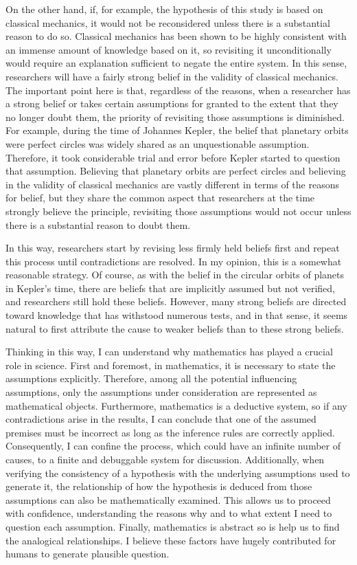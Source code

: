 \documentclass{article}
\begin{document}
On the other hand, if, for example, the hypothesis of this study is based on classical mechanics, it would not be reconsidered unless there is a substantial reason to do so. Classical mechanics has been shown to be highly consistent with an immense amount of knowledge based on it, so revisiting it unconditionally would require an explanation sufficient to negate the entire system. In this sense, researchers will have a fairly strong belief in the validity of classical mechanics. The important point here is that, regardless of the reasons, when a researcher has a strong belief or takes certain assumptions for granted to the extent that they no longer doubt them, the priority of revisiting those assumptions is diminished. For example, during the time of Johannes Kepler, the belief that planetary orbits were perfect circles was widely shared as an unquestionable assumption. Therefore, it took considerable trial and error before Kepler started to question that assumption. Believing that planetary orbits are perfect circles and believing in the validity of classical mechanics are vastly different in terms of the reasons for belief, but they share the common aspect that researchers at the time strongly believe the principle, revisiting those assumptions would not occur unless there is a substantial reason to doubt them.

In this way, researchers start by revising less firmly held beliefs first and repeat this process until contradictions are resolved. In my opinion, this is a somewhat reasonable strategy. Of course, as with the belief in the circular orbits of planets in Kepler's time, there are beliefs that are implicitly assumed but not verified, and researchers still hold these beliefs. However, many strong beliefs are directed toward knowledge that has withstood numerous tests, and in that sense, it seems natural to first attribute the cause to weaker beliefs than to these strong beliefs.

Thinking in this way, I can understand why mathematics has played a crucial role in science. First and foremost, in mathematics, it is necessary to state the assumptions explicitly. Therefore, among all the potential influencing assumptions, only the assumptions under consideration are represented as mathematical objects. Furthermore, mathematics is a deductive system, so if any contradictions arise in the results, I can conclude that one of the assumed premises must be incorrect as long as the inference rules are correctly applied. Consequently, I can confine the process, which could have an infinite number of causes, to a finite and debuggable system for discussion. Additionally, when verifying the consistency of a hypothesis with the underlying assumptions used to generate it, the relationship of how the hypothesis is deduced from those assumptions can also be mathematically examined. This allows us to proceed with confidence, understanding the reasons why and to what extent I need to question each assumption. Finally, mathematics is abstract so is help us to find the analogical relationships. I believe these factors have hugely contributed for humans to generate plausible question.
\end{document}

